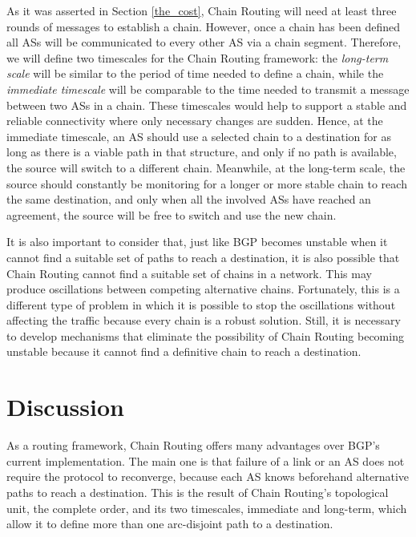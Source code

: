 \documentclass[5p,twocolumn]{elsarticle}
\begin{document}
As it was asserted in Section \ref{the_cost}, Chain Routing will need at least three rounds of messages to establish a chain. However, once a chain has been defined all ASs will be communicated to every other AS via a chain segment. Therefore, we will define two timescales for the Chain Routing framework: the \emph{long-term scale} will be similar to the period of time needed to define a chain, while the \emph{immediate timescale} will be comparable to the time needed to transmit a message between two ASs in a chain. These timescales would help to support a stable and reliable connectivity where only necessary changes are sudden. Hence, at the immediate timescale, an AS should use a selected chain to a destination for as long as there is a viable path in that structure, and only if no path is available, the source will switch to a different chain. Meanwhile, at the long-term scale, the source should constantly be monitoring for a longer or more stable chain to reach the same destination, and only when all the involved ASs have reached an agreement, the source will be free to switch and use the new chain.

It is also important to consider that, just like BGP becomes unstable when it cannot find a suitable set of paths to reach a destination, it is also possible that Chain Routing cannot find a suitable set of chains in a network. This may produce oscillations between competing alternative chains. Fortunately, this is a different type of problem in which it is possible to stop the oscillations without affecting the traffic because every chain is a robust solution. Still, it is necessary to develop mechanisms that eliminate the possibility of Chain Routing becoming unstable because it cannot find a definitive chain to reach a destination.




\section{Discussion}\label{discusion}

As a routing framework, Chain Routing offers many advantages over BGP's current implementation. The main one is that failure of a link or an AS does not require the protocol to reconverge, because each AS knows beforehand alternative paths to reach a destination. This is the result of Chain Routing's topological unit, the complete order, and its two timescales, immediate and long-term, which allow it to define more than one arc-disjoint path to a destination.
\end{document}
